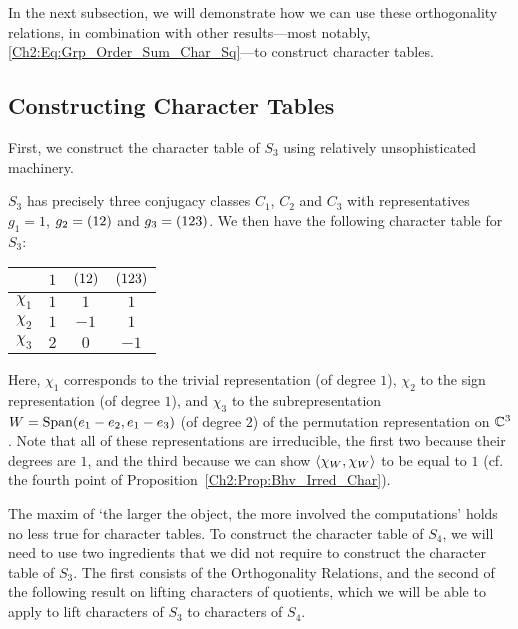 In the next subsection, we will demonstrate how we can use these orthogonality relations, in combination with other results---most notably, \eqref{Ch2:Eq:Grp_Order_Sum_Char_Sq}---to construct character tables.

\subsection{Constructing Character Tables}

First, we construct the character table of $S_3$ using relatively unsophisticated machinery.

\begin{boxexample}[$S_3$]\label{Ch2:Eg:S3_CharTable}
    $S_3$ has precisely three conjugacy classes $C_1$, $C_2$ and $C_3$ with representatives $g_1 = 1$, $g_2 = \left( 1 2 \right)$ and $g_3 = \left( 1 2 3 \right)$. We then have the following character table for $S_3$:
    \begin{table}[H]
        \centering
        \begin{tabular}{c|ccc}
            & $1$ & $\left( 12 \right)$ & $\left( 123 \right)$ \\
            \hline
            $\chi_1$ & $1$ & $1$ & $1$ \\
            $\chi_2$ & $1$ & $-1$ & $1$ \\
            $\chi_3$ & $2$ & $0$ & $-1$
        \end{tabular}
    \end{table}
    Here, $\chi_1$ corresponds to the trivial representation (of degree $1$), $\chi_2$ to the sign representation (of degree $1$), and $\chi_3$ to the subrepresentation $W = \operatorname{Span}\!\left( e_1 - e_2, e_1 - e_3 \right)$ (of degree $2$) of the permutation representation on $\mathbb{C}^3$. Note that all of these representations are irreducible, the first two because their degrees are $1$, and the third because we can show $\left\langle \chi_W, \chi_W \right\rangle$ to be equal to $1$ (cf. the fourth point of Proposition~\ref{Ch2:Prop:Bhv_Irred_Char}).
\end{boxexample}

The maxim of `the larger the object, the more involved the computations' holds no less true for character tables. To construct the character table of $S_4$, we will need to use two ingredients that we did not require to construct the character table of $S_3$. The first consists of the Orthogonality Relations, and the second of the following result on lifting characters of quotients, which we will be able to apply to lift characters of $S_3$ to characters of $S_4$.

